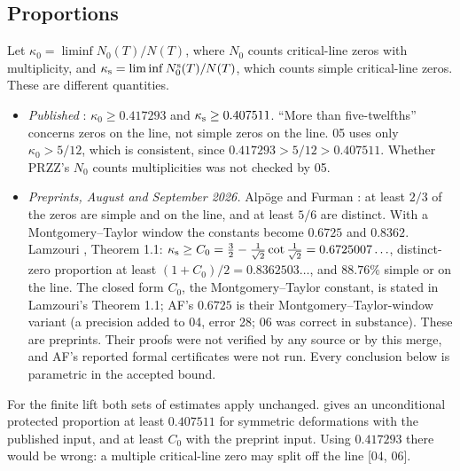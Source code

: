 \documentclass[11pt,a4paper]{article}
\numberwithin{equation}{section}
\theoremstyle{definition}
\theoremstyle{remark}
\newcommand{\src}[1]{\textup{[#1]}}
\begin{document}
\subsection{Proportions}\label{gz:sec:proportions}
Let $\kappa_0=\liminf N_0(T)/N(T)$, where $N_0$ counts critical-line zeros with
multiplicity, and $\kappa_{\rm s}=\liminf N_0^{\rm s}(T)/N(T)$, which counts
simple critical-line zeros. These are different quantities.
\begin{itemize}
\item \emph{Published} \cite{PRZZ}: $\kappa_0\ge0.417293$ and
 $\kappa_{\rm s}\ge0.407511$. ``More than five-twelfths'' concerns zeros on the
 line, not simple zeros on the line. 05 uses only $\kappa_0>5/12$, which is
 consistent, since $0.417293>5/12>0.407511$. Whether PRZZ's $N_0$ counts
 multiplicities was not checked by 05.
\item \emph{Preprints, August and September 2026.} Alp\"oge and Furman
 \cite{AF}: at least $2/3$ of the zeros are simple and on the line, and at
 least $5/6$ are distinct. With a Montgomery--Taylor window the constants
 become $0.6725$ and $0.8362$. Lamzouri \cite{Lamzouri}, Theorem 1.1:
 $\kappa_{\rm s}\ge C_0=\tfrac32-\tfrac1{\sqrt2}\cot\tfrac1{\sqrt2}=0.6725007\ldots$,
 distinct-zero proportion at least $(1+C_0)/2=0.8362503\ldots$, and $88.76\%$
 simple or on the line. The closed form $C_0$, the Montgomery--Taylor
 constant, is stated in Lamzouri's Theorem 1.1; AF's $0.6725$ is their
 Montgomery--Taylor-window variant (a precision added to 04, error 28; 06
 was correct in substance). These are preprints. Their proofs were not verified by any
 source or by this merge, and AF's reported formal certificates were not
 run. Every conclusion below is parametric in the accepted bound.
\end{itemize}
For the finite lift both sets of estimates apply unchanged.
 gives an unconditional protected proportion at least
$0.407511$ for symmetric deformations with the published input, and at least
$C_0$ with the preprint input. Using $0.417293$ there would be wrong: a
multiple critical-line zero may split off the line \src{04, 06}.
\end{document}
